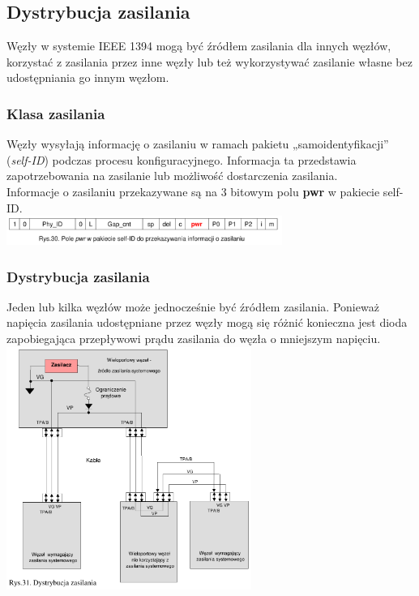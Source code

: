 \subsection{Dystrybucja zasilania}
Węzły w systemie IEEE 1394 mogą być źródłem zasilania dla innych węzłów, korzystać z zasilania przez inne węzły lub też wykorzystywać zasilanie własne bez udostępniania go innym węzłom.\\
\subsubsection{Klasa zasilania}
Węzły wysyłają informację o zasilaniu w ramach pakietu „samoidentyfikacji” (\emph{self-ID}) podczas procesu konfiguracyjnego. Informacja ta przedstawia zapotrzebowania na zasilanie lub możliwość dostarczenia zasilania.\\
Informacje o zasilaniu przekazywane są na 3 bitowym polu \textbf{pwr} w pakiecie self-ID.\\
\includegraphics[width=9cm]{./wyklady/FIREWIRE_32_1.pdf}
\subsubsection{Dystrybucja zasilania}
Jeden lub kilka węzłów może jednocześnie być źródłem zasilania. Ponieważ napięcia zasilania udostępniane przez węzły mogą się różnić konieczna jest dioda zapobiegająca przepływowi prądu zasilania do węzła o mniejszym napięciu.\\
\includegraphics[width=8cm]{./wyklady/FIREWIRE_33_1.pdf}


